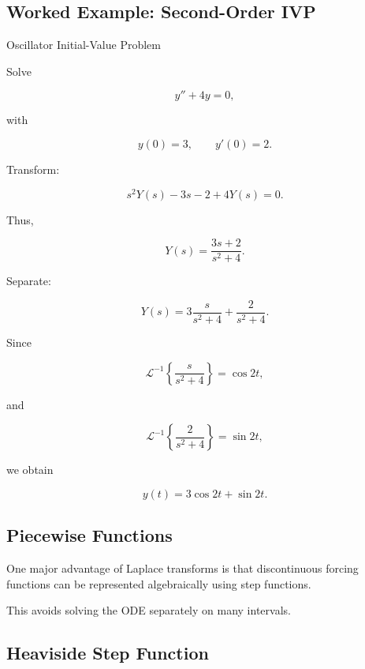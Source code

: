\subsection{Worked Example: Second-Order IVP}
\label{subsec:worked-laplace-second-order-ivp}

\begin{workedexamplebox}{Oscillator Initial-Value Problem}

Solve

\[
y''+4y=0,
\]

with

\[
y(0)=3,
\qquad
y'(0)=2.
\]

Transform:

\[
s^2Y(s)
-
3s
-
2
+
4Y(s)
=
0.
\]

Thus,

\[
Y(s)
=
\frac{
3s+2
}{
s^2+4
}.
\]

Separate:

\[
Y(s)
=
3
\frac{s}{s^2+4}
+
\frac2{s^2+4}.
\]

Since

\[
\mathcal{L}^{-1}
\left\{
\frac{s}{s^2+4}
\right\}
=
\cos2t,
\]

and

\[
\mathcal{L}^{-1}
\left\{
\frac2{s^2+4}
\right\}
=
\sin2t,
\]

we obtain

\begin{answerbox}
\[
\boxed{
y(t)
=
3\cos2t
+
\sin2t.
}
\]
\end{answerbox}

\end{workedexamplebox}

\subsection{Piecewise Functions}
\label{subsec:laplace-piecewise-functions}

One major advantage of Laplace transforms is that discontinuous forcing
functions can be represented algebraically using step functions.

This avoids solving the ODE separately on many intervals.

\subsection{Heaviside Step Function}
\label{subsec:heaviside-step-function}


